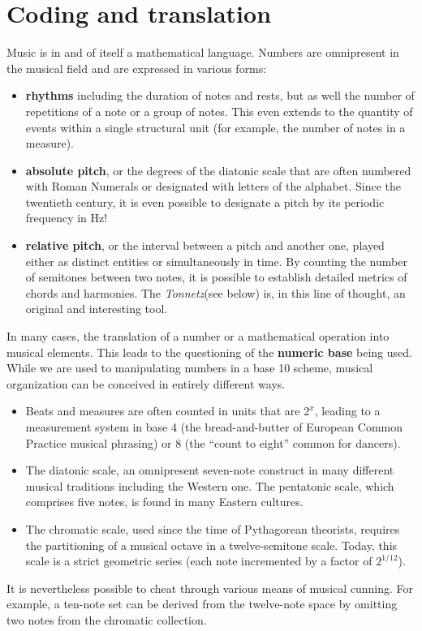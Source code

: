 \documentclass{article}
\newcommand{\Tonnetz}{\emph{Tonnetz}}
\begin{document}
\section*{Coding and translation}
Music is in and of itself a mathematical language. Numbers are omnipresent in the musical field and are expressed in various forms:

\begin{itemize}
\item \textbf{rhythms} including the duration of notes and rests, but as
well the number of repetitions of a note or a group of notes.  This even
extends to the quantity of events within a single structural unit (for
example, the number of notes in a measure).
\item \textbf{absolute pitch}, or the degrees of the diatonic scale that are
often numbered with Roman Numerals or designated with letters of the
alphabet. Since the twentieth century, it is even possible to designate a
pitch by its periodic frequency in Hz!
\item \textbf{relative pitch}, or the interval between a pitch and another
one, played either as distinct entities or simultaneously in time. By counting the
number of semitones between two notes, it is possible to establish detailed
metrics of chords and harmonies. The \Tonnetz (see below) is, in this
line of thought, an original and interesting tool.
\end{itemize}
In many cases, the translation of a number or a mathematical operation
into musical elements.  This leads to the questioning of the \textbf{numeric
base} being used.  While we are used to manipulating numbers in a base 10
scheme, musical organization can be conceived in entirely different ways.
\begin{itemize}
\item Beats and measures are often counted in units that are $2^x$, leading
to a measurement system in base 4 (the bread-and-butter of European Common Practice
musical phrasing) or 8 (the ``count to eight'' common for dancers).
\item The diatonic scale, an omnipresent seven-note construct in many different musical
traditions including the Western one. The pentatonic scale, which comprises
five notes, is found in many Eastern cultures.
\item The chromatic scale, used since the time of Pythagorean theorists,
requires the partitioning of a musical octave in a twelve-semitone scale.
Today, this scale is a strict geometric series (each note incremented by a
factor of $2^{1/12}$).
\end{itemize}
It is nevertheless possible to cheat through various means of musical
cunning.  For example, a ten-note set can be derived from the twelve-note
space by omitting two notes from the chromatic collection.
\end{document}
